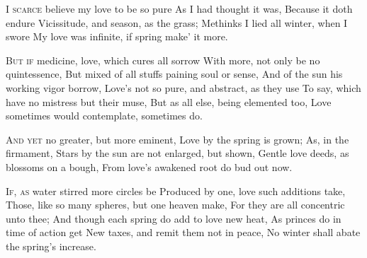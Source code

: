 \documentclass[fontsize=9, a5paper]{scrbook}
\newcommand\blankpage{%
    \null
    \thispagestyle{empty}%
    \addtocounter{page}{-1}%
    \newpage}
\begin{document}
\afterpage{\blankpage}
\begin{poem}
	\begin{stanza}
		\textsc{I scarce} believe my love to be so pure\verseline
		   \verseindent As I had thought it was,\verseline
		   \verseindent Because it doth endure\verseline
		Vicissitude, and season, as the grass;\verseline
		Methinks I lied all winter, when I swore\verseline
		My love was infinite, if spring make’ it more.
	\end{stanza}
	
	\begin{stanza}
		\textsc{But if} medicine, love, which cures all sorrow\verseline
		With more, not only be no quintessence,\verseline
		But mixed of all stuffs paining soul or sense,\verseline
		And of the sun his working vigor borrow,\verseline
		Love’s not so pure, and abstract, as they use\verseline
		To say, which have no mistress but their muse,\verseline
		But as all else, being elemented too,\verseline
		Love sometimes would contemplate, sometimes do.
	\end{stanza}
	
	\begin{stanza}
		\textsc{And yet} no greater, but more eminent,\verseline
		   \verseindent Love by the spring is grown;\verseline
		   \verseindent As, in the firmament,\verseline
		Stars by the sun are not enlarged, but shown,\verseline
		Gentle love deeds, as blossoms on a bough,\verseline
		From love’s awakened root do bud out now.
	\end{stanza}
	
	\begin{stanza}
		\textsc{If, as} water stirred more circles be\verseline
		Produced by one, love such additions take,\verseline
		Those, like so many spheres, but one heaven make,\verseline
		For they are all concentric unto thee;\verseline
		And though each spring do add to love new heat,\verseline
		As princes do in time of action get\verseline
		New taxes, and remit them not in peace,\verseline
		No winter shall abate the spring’s increase.
	\end{stanza}
\end{poem}

\pagebreak
\end{document}
